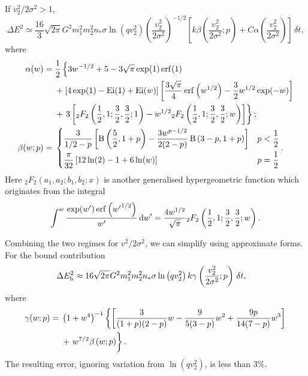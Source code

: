If $v_2^2/2\sigma^2 > 1$,
\begin{equation}
\Delta E^2 \simeq \dfrac{16}{3}\sqrt{2\pi}G^2m_1^2 m_2^2n_\ast\sigma\ln\left(qv_2^2\right) \left(\dfrac{v_2^2}{2\sigma^2}\right)^{-1/2} \left[k\beta\left(\dfrac{v_2^2}{2\sigma^2};p\right) + C\alpha\left(\dfrac{v_2^2}{2\sigma^2}\right)\right]\,\delta t,
\end{equation}
where
\begin{align}
\alpha(w) = {} & \recip{2}\left\{3w^{-1/2} + 5 - 3\sqrt{\pi}\exp(1)\erf(1) \right. \nonumber\\*
 {} & + \left[4\exp(1) - \Ei(1) + \Ei(w)\right]\left[\dfrac{3\sqrt{\pi}}{4}\erf\left(w^{1/2}\right) - \dfrac{3}{2}w^{1/2}\exp(-w)\right] \nonumber \\*
 {} & + \left. 3\left[{_2F_2}\left(\dfrac{1}{2},1;\dfrac{3}{2},\dfrac{3}{2};1\right) - w^{1/2}{_2F_2}\left(\dfrac{1}{2},1;\dfrac{3}{2},\dfrac{3}{2};w\right)\right]\right\}; \\
\beta(w;p) = {} & \begin{cases} \dfrac{3}{1/2 - p}\left[\Beta\left(\dfrac{5}{2},1+p\right) - \dfrac{3w^{p-1/2}}{2(2-p)}\Beta\left(3-p,1+p\right)\right] \vspace{1mm} & p < \recip{2} \\
\dfrac{\pi}{32}\left[12 \ln(2) - 1 + 6 \ln(w)\right] & p = \recip{2} \end{cases} . 
\end{align}
Here ${_2F_2}(a_1,a_2;b_1,b_2;x)$ is another generalised hypergeometric function which originates from the integral
\begin{equation}
\int_{}^{w}{\dfrac{\exp(w')\operatorname{erf}\left({w'}^{1/2}\right)}{w'}}\,\mathrm{d}{w'} = \dfrac{4w^{1/2}}{\sqrt{\pi}}{_2F_2}\left(\dfrac{1}{2},1;\dfrac{3}{2},\dfrac{3}{2};w\right).
\end{equation}

Combining the two regimes for $v^2/2\sigma^2$, we can simplify using approximate forms. For the bound contribution 
\begin{align}
\Delta E_\mathrm{b}^2 \approx {} & 16\sqrt{2\pi}G^2m_1^2m_2^2n_\ast\sigma\ln\left(qv_2^2\right) k \gamma\left(\dfrac{v_2^2}{2\sigma^2};p\right)\,\delta t,
\label{eq:Bound-approx}
\end{align}
where
\begin{align}
\gamma(w;p) = {} & \left(1 + w^4\right)^{-1}\left\{\left[\dfrac{3}{(1 + p)(2 - p)}w - \dfrac{9}{5(3-p)}w^2 + \dfrac{9p}{14(7-p)}w^3 \right] \right. \nonumber \\*
{} & + \left. \vphantom{\left[\dfrac{0}{p}\right]} w^{7/2}\beta\left(w;p\right)\right\}.
\end{align}
The resulting error, ignoring variation from $\ln\left(qv_2^2\right)$, is less than $3\%$.

